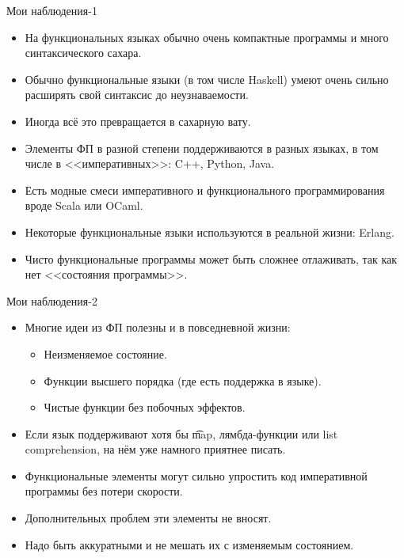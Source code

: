 \begin{frame}{Мои наблюдения-1}
	\begin{itemize}
		\item На функциональных языках обычно очень компактные программы и много синтаксического сахара.
		\item Обычно функциональные языки (в том числе Haskell) умеют очень сильно расширять свой синтаксис до неузнаваемости.
		\item Иногда всё это превращается в сахарную вату.
		\item Элементы ФП в разной степени поддерживаются в разных языках, в том числе в
			<<императивных>>: C++, Python, Java.
		\item Есть модные смеси императивного и функционального программирования вроде Scala или OCaml.
		\item Некоторые функциональные языки используются в реальной жизни: Erlang.
		\item Чисто функциональные программы может быть сложнее отлаживать, так как нет <<состояния программы>>.
	\end{itemize}
\end{frame}

\begin{frame}{Мои наблюдения-2}
	\begin{itemize}
		\item Многие идеи из ФП полезны и в повседневной жизни:
			\begin{itemize}
				\item Неизменяемое состояние.
				\item Функции высшего порядка (где есть поддержка в языке).
				\item Чистые функции без побочных эффектов.
			\end{itemize}
		\item Если язык поддерживают хотя бы \t{map}, лямбда-функции или list comprehension,
			на нём уже намного приятнее писать.
		\item Функциональные элементы могут сильно упростить код императивной программы без потери скорости.
		\item Дополнительных проблем эти элементы не вносят.
		\item Надо быть аккуратными и не мешать их с изменяемым состоянием.
	\end{itemize}
\end{frame}
